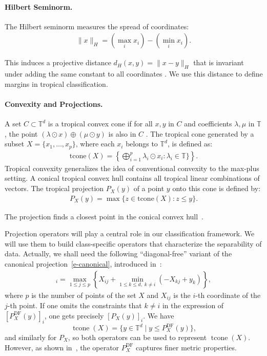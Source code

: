 \documentclass{article}
\renewcommand{\leq}{\leqslant}
\newcommand{\trop}{\mathbb{T}}
\begin{document}
\paragraph{Hilbert Seminorm.}
The Hilbert seminorm measures the spread of coordinates:
\begin{align}
\|x\|_H = \left(\max_i x_i\right) - \left(\min_i x_i\right).
\end{align}

This induces a projective distance $d_H(x,y) = \|x - y\|_H$ that is invariant under adding the same constant to all coordinates \cite{cohen2004}. We use this distance to define margins in tropical classification.

\paragraph{Convexity and Projections.}
A set $C \subset \trop^d$ is a tropical convex cone if for all $x,y$ in $C$ and coefficients $\lambda,\mu$ in $\trop$,
the point $(\lambda \odot x) \oplus (\mu \odot y)$ is also in $C$ \cite{cohen2004,develin2004}.
The tropical cone generated by a subset $X=\{x_1,\ldots,x_p\}$, where
each $x_i$ belongs to $\trop^d$, is defined as:
\begin{align}
  \text{tcone}(X) = \left\{\bigoplus_{i=1}^p \lambda_i \odot x_i : \lambda_i \in \trop\} \right\}.
\end{align}
Tropical convexity generalizes the idea of conventional convexity to the max-plus setting. A conical tropical convex hull contains all tropical linear combinations of vectors. 
The tropical projection $P_X(y)$ of a point $y$ onto this cone is
defined by:
\begin{align}
P_X(y) = \max\{z \in \text{tcone}(X) : z \leq y\}\label{e-canonical}.
\end{align}

The projection finds a closest point in the conical convex hull~\cite{AGNS10}.

Projection operators will play a central role in our classification framework. We will use them to build class-specific operators that characterize the separability of data.
Actually, we shall need the following ``diagonal-free'' variant of the canonical projection~\eqref{e-canonical},
introduced in~\cite{akiangaubertqisaadi}:
\begin{align}
  [P_X^{\text{DF}}(y)]_i = \max_{1 \leq j \leq p} \left\{X_{ij} + \min_{1\leq k\leq d,\; k \neq i} (-X_{kj} + y_k)\right\},
  \label{e-def-DF}
\end{align}
where $p$ is the number of points of the set $X$ and $X_{ij}$ is the $i$-th coordinate of the $j$-th point.
If one omits the constraints that $k\neq i$ in the expression of $[P_X^{\text{DF}}(y)]_i$, one gets
precisely $[P_X(y)]_i$. We have 
$$\operatorname{tcone}(X)= \{y\in \trop^d\mid y\leq P_X^{\text{DF}}(y)\},$$
and similarly for $P_X$, so both operators can be used to represent $\operatorname{tcone}(X)$.
However, as shown in~\cite{akiangaubertqisaadi}, the operator $P_X^{\text{DF}}$ captures finer metric properties.
\end{document}
